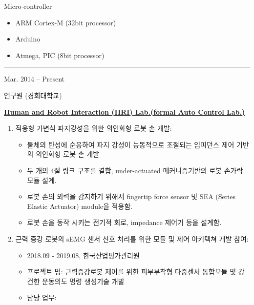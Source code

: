 \documentclass[a4paper,10pt]{article}
\newlength{\cvcolumngapwidth}
\newlength{\cvleftcolumnwidth}
\newlength{\cvrightcolumnwidth}
\newcommand{\cvsectionstyle}[1]{{\normalsize\cvsectionfont\textcolor{cvsectioncolor}{#1}}}
\newcommand{\cvtitlestyle}[1]{{\large\cvtitlefont\textcolor{cvtitlecolor}{#1}}}
\newcommand{\cvdurationstyle}[1]{{\small\cvdurationfont\textcolor{cvdurationcolor}{#1}}}
\newcommand{\cvheadingstyle}[1]{{\normalsize\cvheadingfont\textcolor{cvheadingcolor}{#1}}}
\newlength{\cvafteritemskipamount}
\newlength{\cvaftersectionskipamount}
\newlength{\cvbetweensectionandheadingextraskipamount}
\newlength{\cvaftertitleskipamount}
\newlength{\cvparskip}
\newcommand{\cvsection}[1]{
    \begin{minipage}[t]{\cvleftcolumnwidth}
        \raggedleft\cvsectionstyle{#1}
    \end{minipage}%
    \hspace{\cvcolumngapwidth}%
    \begin{minipage}[t]{\cvrightcolumnwidth}
        \textcolor{cvrulecolor}{\rule{\cvrightcolumnwidth}{0.3mm}}
    \end{minipage}

    \vspace{\cvaftersectionskipamount}
}
\newcommand{\cvitem}[2]{
    \begin{minipage}[t]{\cvleftcolumnwidth}
        \raggedleft #1
    \end{minipage}%
    \hspace{\cvcolumngapwidth}%
    \begin{minipage}[t]{\cvrightcolumnwidth}
        \setlength{\parskip}{\cvparskip} #2
    \end{minipage}

    \vspace{\cvafteritemskipamount}
}
\newcommand{\cvtitle}[1]{
    \cvtitlestyle{#1}

    \vspace{\cvaftertitleskipamount}
    \vspace{-\cvparskip}
}
\begin{document}
\cvitem{
    \cvheadingstyle{Micro-controller}
}{
    \begin{itemize}
        \item ARM Cortex-M (32bit processor)
        \item Arduino
        \item Atmega, PIC (8bit processor)
    \end{itemize}
}
\newpage
\cvsection{Professional Experience}

\vspace{\cvbetweensectionandheadingextraskipamount}

\cvitem{
    \cvdurationstyle{Mar. 2014 -- Present}
}{
    \cvtitle{연구원 (경희대학교)}
    \item \underline{\textbf{Human and Robot Interaction (HRI) Lab.(formal Auto Control Lab.)}}
    \begin{enumerate}
        \item 적응형 가변식 파지강성을 위한 의인화형 로봇 손 개발: 
        \begin{itemize}
            \item 물체의 탄성에 순응하여 파지 강성이 능동적으로 조절되는 임피던스 제어 기반의 의인화형 로봇 손 개발 
            \item 두 개의 4절 링크 구조를 결합, under-actuated 메커니즘기반의 로봇 손가락 모듈 설계.
            \item 로봇 손의 외력을 감지하기 위해서 fingertip force sensor 및 SEA (Series Elastic Actuator) module을 적용함.
            \item 로봇 손을 동작 시키는 전기적 회로, impedance 제어기 등을 설계함.
        \end{itemize}
        \item 근력 증강 로봇의 sEMG 센서 신호 처리를 위한 모듈 및 제어 아키텍쳐 개발 참여:
        \begin{itemize}
            \item 2018.09 - 2019.08, 한국산업평가관리원 
            \item 프로젝트 명: 근력증강로봇 제어를 위한 피부부착형 다중센서 통합모듈 및 강건한 운동의도 명령 생성기술 개발
            \item 담당 업무:
                \begin{itemize}

\end{itemize}
\end{itemize}
\end{enumerate}}
\end{document}
